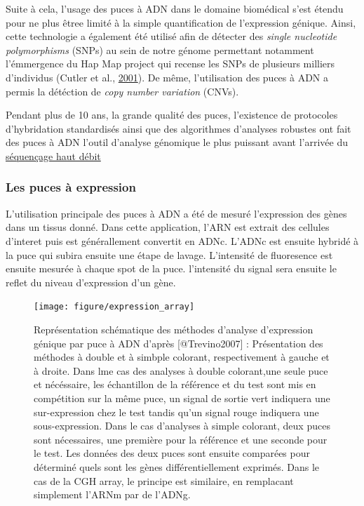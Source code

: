 \documentclass[12pt,twoside]{reedthesis}
\theoremstyle{definition}
\theoremstyle{definition}
\theoremstyle{remark}
\begin{document}
  Suite à cela, l'usage des puces à ADN dans le domaine biomédical s'est
  étendu pour ne plus êtree limité à la simple quantification de
  l'expression génique. Ainsi, cette technologie a également été utilisé
  afin de détecter des \emph{single nucleotide polymorphisms} (SNPs) au
  sein de notre génome permettant notamment l'émmergence du Hap Map
  project qui recense les SNPs de plusieurs milliers d'individus (Cutler
  et al., \protect\hyperlink{ref-Cutler2001}{2001}). De même,
  l'utilisation des puces à ADN a permis la détéction de \emph{copy number
  variation} (CNVs).
  
  Pendant plus de 10 ans, la grande qualité des puces, l'existence de
  protocoles d'hybridation standardisés ainsi que des algorithmes
  d'analyses robustes ont fait des puces à ADN l'outil d'analyse génomique
  le plus puissant avant l'arrivée du \protect\hyperlink{ngs}{séquençage
  haut débit}
  
  \newpage
  
  \subsubsection{Les puces à expression}\label{les-puces-a-expression}
  
  L'utilisation principale des puces à ADN a été de mesuré l'expression
  des gènes dans un tissus donné. Dans cette application, l'ARN est
  extrait des cellules d'interet puis est générallement convertit en ADNc.
  L'ADNc est ensuite hybridé à la puce qui subira ensuite une étape de
  lavage. L'intensité de fluoresence est ensuite mesurée à chaque spot de
  la puce. l'intensité du signal sera ensuite le reflet du niveau
  d'expression d'un gène.
  
  \begin{figure}
  
  {\centering \texttt{[image: figure/expression\_array]} 
  
  }
  
  \caption[Représentation schématique des méthodes d'analyse d'expression génique par puce à ADN]{Représentation schématique des méthodes d'analyse d'expression génique par puce à ADN d'après [@Trevino2007] : Présentation des méthodes à double et à simbple colorant, respectivement à gauche et à droite. Dans lme cas des analyses à double colorant,une seule puce et nécéssaire, les échantillon de la référence et du test sont mis en compétition sur la même puce, un signal de sortie vert indiquera une sur-expression chez le test tandis qu'un signal rouge indiquera une sous-expression.  Dans le cas d'analyses à simple colorant, deux puces sont nécessaires, une première pour la référence et une seconde pour le test. Les données des deux puces sont ensuite comparées pour déterminé quels sont les gènes différentiellement exprimés. Dans le cas de la CGH array, le principe est similaire, en remplacant simplement l'ARNm par de l'ADNg.}\label{fig:figexparray}
  \end{figure}
  
\end{document}
